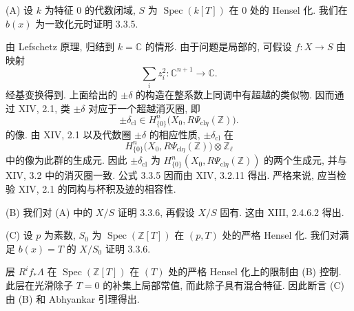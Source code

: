 \medskip
\noindent\textup{(A)}
设 $k$ 为特征 $0$ 的代数闭域, $S$ 为 $\operatorname{Spec}(k[T])$ 在 $0$ 处的 Hensel 化. 我们在 $b(x)$ 为一致化元时证明 3.3.5.

由 Lefschetz 原理, 归结到 $k=\mathbb C$ 的情形. 由于问题是局部的, 可假设 $f:X\to S$ 由映射
\[
\sum_i z_i^2:\mathbb C^{n+1}\longrightarrow\mathbb C.
\]
经基变换得到. 上面给出的 $\pm\delta$ 的构造在整系数上同调中有超越的类似物. 因而通过 XIV, 2.1, 类 $\pm\delta$ 对应于一个超越消灭圈, 即
\[
\pm\delta_{\mathrm{cl}}
\in H^n_{\{0\}}\bigl(X_0,R\Psi_{\mathrm{cl}\eta}(\mathbb Z)\bigr).
\]
的像. 由 XIV, 2.1 以及代数圈 $\pm\delta$ 的相应性质, $\pm\delta_{\mathrm{cl}}$ 在
\[
H^n_{\{0\}}\bigl(X_0,R\Psi_{\mathrm{cl}\eta}(\mathbb Z)\bigr)
\otimes\mathbb Z_\ell
\]
中的像为此群的生成元. 因此 $\pm\delta_{\mathrm{cl}}$ 为 $H^n_{\{0\}}(X_0,R\Psi_{\mathrm{cl}\eta}(\mathbb Z))$ 的两个生成元, 并与 XIV, 3.2 中的消灭圈一致. 公式 3.3.5 因而由 XIV, 3.2.11 得出. 严格来说, 应当检验 XIV, 2.1 的同构与杯积及迹的相容性.

\medskip
\noindent\textup{(B)}
我们对 (A) 中的 $X/S$ 证明 3.3.6, 再假设 $X/S$ 固有. 这由 XIII, 2.4.6.2 得出.

\medskip
\noindent\textup{(C)}
设 $p$ 为素数, $S_0$ 为 $\operatorname{Spec}(\mathbb Z[T])$ 在 $(p,T)$ 处的严格 Hensel 化. 我们对满足 $b(x)=T$ 的 $X/S_0$ 证明 3.3.6.

层 $R^if_*\Lambda$ 在 $\operatorname{Spec}(\mathbb Z[T])$ 在 $(T)$ 处的严格 Hensel 化上的限制由 (B) 控制. 此层在光滑除子 $T=0$ 的补集上局部常值, 而此除子具有混合特征. 因此断言 (C) 由 (B) 和 Abhyankar 引理得出.